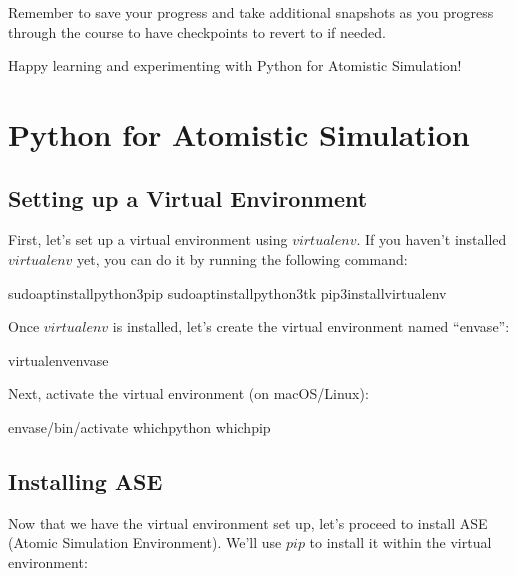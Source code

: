 \documentclass[letterpaper,10pt,english]{sphinxmanual}
\begin{document}
\sphinxAtStartPar
Remember to save your progress and take additional snapshots as you progress through the course to have checkpoints to revert to if needed.

\sphinxAtStartPar
Happy learning and experimenting with Python for Atomistic Simulation!

\sphinxstepscope


\chapter{Python for Atomistic Simulation}
\label{\detokenize{basics/basics:python-for-atomistic-simulation}}\label{\detokenize{basics/basics::doc}}

\section{Setting up a Virtual Environment}
\label{\detokenize{basics/basics:setting-up-a-virtual-environment}}
\sphinxAtStartPar
First, let’s set up a virtual environment using \(virtualenv\). If you haven’t installed \(virtualenv\) yet, you can do it by running the following command:

\begin{sphinxVerbatim}[commandchars=\\\{\}]
sudoaptinstallpython3\PYGZhy{}pip
sudoaptinstallpython3\PYGZhy{}tk
pip3installvirtualenv
\end{sphinxVerbatim}

\sphinxAtStartPar
Once \(virtualenv\) is installed, let’s create the virtual environment named “envase”:

\begin{sphinxVerbatim}[commandchars=\\\{\}]
virtualenvenvase
\end{sphinxVerbatim}

\sphinxAtStartPar
Next, activate the virtual environment (on macOS/Linux):

\begin{sphinxVerbatim}[commandchars=\\\{\}]
envase/bin/activate
whichpython
whichpip
\end{sphinxVerbatim}


\section{Installing ASE}
\label{\detokenize{basics/basics:installing-ase}}
\sphinxAtStartPar
Now that we have the virtual environment set up, let’s proceed to install ASE (Atomic Simulation Environment). We’ll use \(pip\) to install it within the virtual environment:
\end{document}
